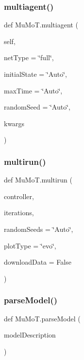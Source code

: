 \mbox{\label{namespace_mu_mo_t_a216306531856784e222e197b969ca8b5}} 
\subsubsection{\texorpdfstring{multiagent()}{multiagent()}}
{\footnotesize\ttfamily def Mu\+Mo\+T.\+multiagent (\begin{DoxyParamCaption}\item[{}]{self,  }\item[{}]{net\+Type = {\ttfamily \char`\"{}full\char`\"{}},  }\item[{}]{initial\+State = {\ttfamily \char`\"{}Auto\char`\"{}},  }\item[{}]{max\+Time = {\ttfamily \char`\"{}Auto\char`\"{}},  }\item[{}]{random\+Seed = {\ttfamily \char`\"{}Auto\char`\"{}},  }\item[{}]{kwargs }\end{DoxyParamCaption})}

\mbox{\label{namespace_mu_mo_t_a5f588d13e4c113e7e9a6f862112558cc}} 
\subsubsection{\texorpdfstring{multirun()}{multirun()}}
{\footnotesize\ttfamily def Mu\+Mo\+T.\+multirun (\begin{DoxyParamCaption}\item[{}]{controller,  }\item[{}]{iterations,  }\item[{}]{random\+Seeds = {\ttfamily \char`\"{}Auto\char`\"{}},  }\item[{}]{plot\+Type = {\ttfamily \char`\"{}evo\char`\"{}},  }\item[{}]{download\+Data = {\ttfamily False} }\end{DoxyParamCaption})}

\mbox{\label{namespace_mu_mo_t_a563aad4a460dbcc0705cf99bb6f6dd5d}} 
\subsubsection{\texorpdfstring{parse\+Model()}{parseModel()}}
{\footnotesize\ttfamily def Mu\+Mo\+T.\+parse\+Model (\begin{DoxyParamCaption}\item[{}]{model\+Description }\end{DoxyParamCaption})}

